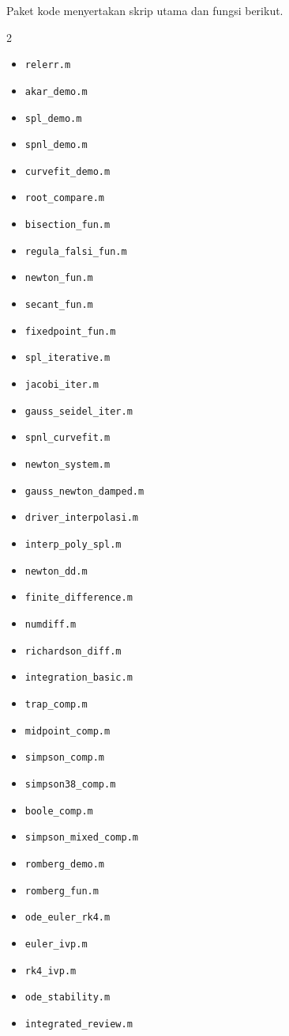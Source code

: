 \documentclass[book,english,noindex,lean,nobackpage,nocopyright,noupdate,nofiglist,notablist]{enacom}
\begin{document}
Paket kode menyertakan skrip utama dan fungsi berikut.
\begin{multicols}{2}
\begin{itemize}
\item \texttt{relerr.m}
\item \texttt{akar\_demo.m}
\item \texttt{spl\_demo.m}
\item \texttt{spnl\_demo.m}
\item \texttt{curvefit\_demo.m}
\item \texttt{root\_compare.m}
\item \texttt{bisection\_fun.m}
\item \texttt{regula\_falsi\_fun.m}
\item \texttt{newton\_fun.m}
\item \texttt{secant\_fun.m}
\item \texttt{fixedpoint\_fun.m}
\item \texttt{spl\_iterative.m}
\item \texttt{jacobi\_iter.m}
\item \texttt{gauss\_seidel\_iter.m}
\item \texttt{spnl\_curvefit.m}
\item \texttt{newton\_system.m}
\item \texttt{gauss\_newton\_damped.m}
\item \texttt{driver\_interpolasi.m}
\item \texttt{interp\_poly\_spl.m}
\item \texttt{newton\_dd.m}
\item \texttt{finite\_difference.m}
\item \texttt{numdiff.m}
\item \texttt{richardson\_diff.m}
\item \texttt{integration\_basic.m}
\item \texttt{trap\_comp.m}
\item \texttt{midpoint\_comp.m}
\item \texttt{simpson\_comp.m}
\item \texttt{simpson38\_comp.m}
\item \texttt{boole\_comp.m}
\item \texttt{simpson\_mixed\_comp.m}
\item \texttt{romberg\_demo.m}
\item \texttt{romberg\_fun.m}
\item \texttt{ode\_euler\_rk4.m}
\item \texttt{euler\_ivp.m}
\item \texttt{rk4\_ivp.m}
\item \texttt{ode\_stability.m}
\item \texttt{integrated\_review.m}
\end{itemize}
\end{multicols}
\end{document}
